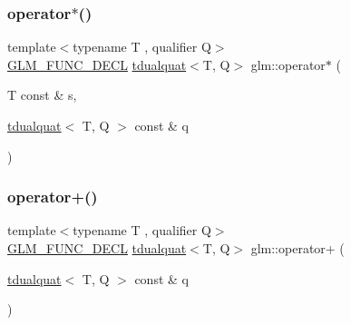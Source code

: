 \mbox{\label{group__gtx__dual__quaternion_gafbd543470cb70432624e046ab85a00e4}} 
\subsubsection{\texorpdfstring{operator$\ast$()}{operator*()}\hspace{0.1cm}{\footnotesize\ttfamily [7/7]}}
{\footnotesize\ttfamily template$<$typename T , qualifier Q$>$ \\
\mbox{\hyperlink{setup_8hpp_ab2d052de21a70539923e9bcbf6e83a51}{G\+L\+M\+\_\+\+F\+U\+N\+C\+\_\+\+D\+E\+CL}} \mbox{\hyperlink{structglm_1_1tdualquat}{tdualquat}}$<$T, Q$>$ glm\+::operator$\ast$ (\begin{DoxyParamCaption}\item[{T const \&}]{s,  }\item[{\mbox{\hyperlink{structglm_1_1tdualquat}{tdualquat}}$<$ T, Q $>$ const \&}]{q }\end{DoxyParamCaption})}

\mbox{\label{group__gtx__dual__quaternion_ga11a89ba9d2bc5ef4ab9bd77ac231fe63}} 
\subsubsection{\texorpdfstring{operator+()}{operator+()}\hspace{0.1cm}{\footnotesize\ttfamily [1/2]}}
{\footnotesize\ttfamily template$<$typename T , qualifier Q$>$ \\
\mbox{\hyperlink{setup_8hpp_ab2d052de21a70539923e9bcbf6e83a51}{G\+L\+M\+\_\+\+F\+U\+N\+C\+\_\+\+D\+E\+CL}} \mbox{\hyperlink{structglm_1_1tdualquat}{tdualquat}}$<$T, Q$>$ glm\+::operator+ (\begin{DoxyParamCaption}\item[{\mbox{\hyperlink{structglm_1_1tdualquat}{tdualquat}}$<$ T, Q $>$ const \&}]{q }\end{DoxyParamCaption})}


